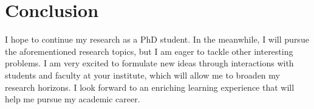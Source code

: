 \section{Conclusion}
\label{sec:conclusion}

I hope to continue my research as a PhD student.
In the meanwhile, I will pursue the aforementioned research topics, but I am eager to tackle other interesting problems.
I am very excited to formulate new ideas through interactions with students and faculty at your institute,
which will allow me to broaden my research horizons. %
I look forward to an enriching learning experience that will help me pursue my academic career.
